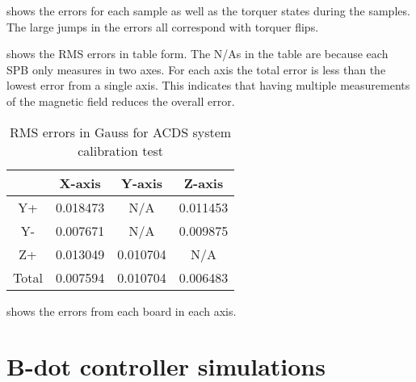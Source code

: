 
 shows the errors for each sample as well as the torquer states during the samples. The large jumps in the errors all correspond with torquer flips.

 shows the RMS errors in table form. The N/As in the table are because each \ac{SPB} only measures in two axes. For each axis the total error is less than the lowest error from a single axis. This indicates that having multiple measurements of the magnetic field reduces the overall error.

\begin{table}[!htb]
    \centering
    \caption{RMS errors in Gauss for \ac{ACDS} system calibration test}
    \label{tab:tcalMSPerr}
    \begin{tabular}{|c|c|c|c|}
        \hline
        &X-axis&Y-axis&Z-axis\\
        \hline
        Y+&0.018473&N/A&0.011453\\
        \hline
        Y-&0.007671&N/A&0.009875\\
        \hline
        Z+&0.013049&0.010704&N/A\\
        \hline
        Total&0.007594&0.010704&0.006483\\
        \hline
    \end{tabular}
\end{table}

 shows the errors from each board in each axis.


\section{B-dot controller simulations}

